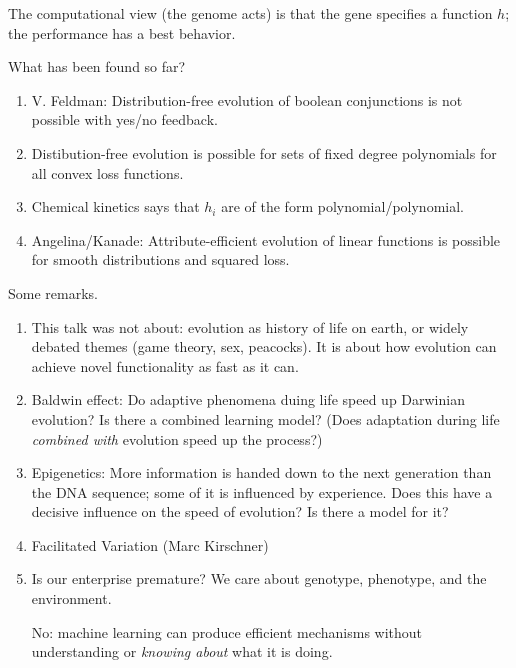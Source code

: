 The computational view (the genome acts) is that the gene specifies a function $h$; the performance has a best behavior.

What has been found so far?
\begin{enumerate}
\item
V. Feldman: Distribution-free evolution of boolean conjunctions is not possible with yes/no feedback.
\item Distibution-free evolution is possible for sets of fixed degree polynomials for all convex loss functions.
\item
Chemical kinetics says that $h_i$ are of the form polynomial/polynomial.
\item
Angelina/Kanade: Attribute-efficient evolution of linear functions is possible for smooth distributions and squared loss.
\end{enumerate}

Some remarks.
\begin{enumerate}
\item
This talk was not about: evolution as history of life on earth, or widely debated themes (game theory, sex, peacocks). It is about how evolution can achieve novel functionality as fast as it can.
\item
Baldwin effect: Do adaptive phenomena duing life speed up Darwinian evolution? Is there a combined learning model?
(Does adaptation during life {\it combined with} evolution speed up the process?)
\item
Epigenetics: More information is handed down to the next generation than the DNA sequence; some of it is influenced by experience. Does this have a decisive influence on the speed of evolution? Is there a model for it?
\item
Facilitated Variation (Marc Kirschner)
\item 
Is our enterprise premature? We care about genotype, phenotype, and the environment.

No: machine learning can produce efficient mechanisms without understanding or {\it knowing about} what it is doing.
\end{enumerate}

